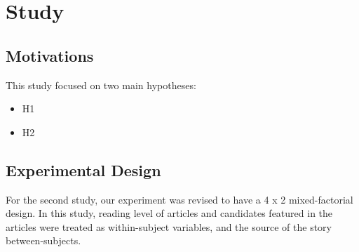 \chapter{Study}

\section{Motivations}  






 

This study focused on two main hypotheses:

\begin{itemize}
  \item H1
  \item H2
\end{itemize}


\section{Experimental Design}

For the second study, our experiment was revised to have a 4 x 2 mixed-factorial design.
In this study, reading level of articles and candidates featured in the articles were treated as within-subject variables, and the source of the story between-subjects.

